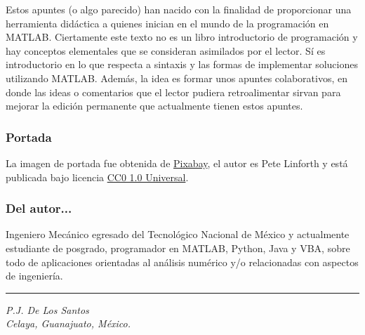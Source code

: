 Estos apuntes (o algo parecido) han nacido con la finalidad de
proporcionar una herramienta didáctica a quienes inician en el mundo de
la programación en MATLAB. Ciertamente este texto no es un libro
introductorio de programación y hay conceptos elementales que se
consideran asimilados por el lector. Sí es introductorio en lo que
respecta a sintaxis y las formas de implementar soluciones utilizando
MATLAB. Además, la idea es formar unos apuntes colaborativos, en donde
las ideas o comentarios que el lector pudiera retroalimentar sirvan para
mejorar la edición permanente que actualmente tienen estos apuntes.

\subsubsection*{Portada}

La imagen de portada fue obtenida de
\href{https://pixabay.com/es/nano-tecnolog\%C3\%ADa-construcci\%C3\%B3n-1480553/}{Pixabay},
el autor es Pete Linforth y está publicada bajo licencia
\href{https://creativecommons.org/publicdomain/zero/1.0/deed.es}{CC0 1.0
Universal}.

\subsubsection*{Del autor...}

Ingeniero Mecánico egresado del Tecnológico Nacional de México y
actualmente estudiante de posgrado, programador en MATLAB, Python, Java
y VBA, sobre todo de aplicaciones orientadas al análisis numérico y/o
relacionadas con aspectos de ingeniería.

\begin{center}\rule{0.5\linewidth}{\linethickness}\end{center}


\emph{P.J. De Los Santos} \\

\emph{Celaya, Guanajuato, México.}

